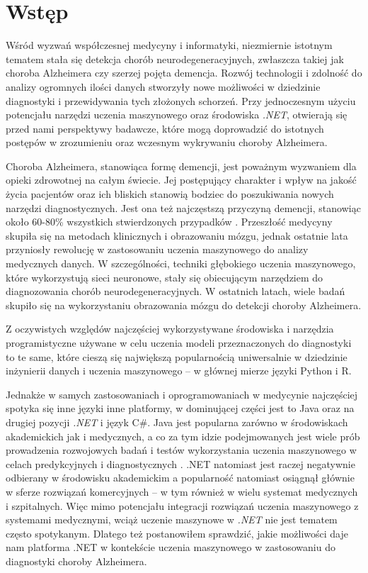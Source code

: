 \chapter*{Wstęp}

Wśród wyzwań współczesnej medycyny i informatyki, niezmiernie istotnym tematem stała się detekcja chorób neurodegeneracyjnych, zwłaszcza takiej jak choroba Alzheimera czy szerzej pojęta demencja.
Rozwój technologii i zdolność do analizy ogromnych ilości danych stworzyły nowe możliwości w dziedzinie diagnostyki i przewidywania tych złożonych schorzeń.
Przy jednoczesnym użyciu potencjału narzędzi uczenia maszynowego oraz środowiska \emph{.NET}, otwierają się przed nami perspektywy badawcze, które mogą doprowadzić do istotnych postępów w zrozumieniu oraz wczesnym wykrywaniu choroby Alzheimera.

Choroba Alzheimera, stanowiąca formę demencji, jest poważnym wyzwaniem dla opieki zdrowotnej na całym świecie.
Jej postępujący charakter i wpływ na jakość życia pacjentów oraz ich bliskich stanowią bodziec do poszukiwania nowych narzędzi diagnostycznych.
Jest ona też najczęstszą przyczyną demencji, stanowiąc około 60-80\% wszystkich stwierdzonych przypadków \cite{what-is-alzheimers:2023}.
Przeszłość medycyny skupiła się na metodach klinicznych i obrazowaniu mózgu, jednak ostatnie lata przyniosły rewolucję w zastosowaniu uczenia maszynowego do analizy medycznych danych.
W szczególności, techniki głębokiego uczenia maszynowego, które wykorzystują sieci neuronowe, stały się obiecującym narzędziem do diagnozowania chorób neurodegeneracyjnych.
W ostatnich latach, wiele badań skupiło się na wykorzystaniu obrazowania mózgu do detekcji choroby Alzheimera.

Z oczywistych względów najczęściej wykorzystywane środowiska i narzędzia programistyczne używane w celu uczenia modeli przeznaczonych do diagnostyki to te same, które cieszą się największą popularnością uniwersalnie w dziedzinie inżynierii danych i uczenia maszynowego -- w głównej mierze języki Python i R.

Jednakże w samych zastosowaniach i oprogramowaniach w medycynie najczęściej spotyka się inne języki inne platformy, w dominującej części jest to Java oraz na drugiej pozycji \emph{.NET} i język C\#.
Java jest popularna zarówno w środowiskach akademickich jak i medycznych, a co za tym idzie podejmowanych jest wiele prób prowadzenia rozwojowych badań i testów wykorzystania uczenia maszynowego w celach predykcyjnych i diagnostycznych \cite{soman2005classification, nithya2017predictive, gobbel2014development, godara2016evaluation}.
.NET natomiast jest raczej negatywnie odbierany w środowisku akademickim a popularność natomiast osiągnął głównie w sferze rozwiązań komercyjnych -- w tym również w wielu systemat medycznych i szpitalnych.
Więc mimo potencjału integracji rozwiązań uczenia maszynowego z systemami medycznymi, wciąż uczenie maszynowe w \emph{.NET} nie jest tematem często spotykanym.
Dlatego też postanowiłem sprawdzić, jakie możliwości daje nam platforma .NET w kontekście uczenia maszynowego w zastosowaniu do diagnostyki choroby Alzheimera.

